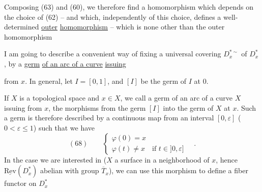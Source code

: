 Composing (63) and (60), we therefore find a homomorphism
which depends on the choice of (62) -- and which, independently of this choice, defines a well-determined \uline{outer} \uline{homomorphism} -- which is none other than the outer homomorphism

I am going to describe a convenient way of fixing a universal covering $D_x^{*\sim}$ of $D_x^*$, by a \uline{germ} \uline{of an arc of a curve}  \uline{issuing}

from $x$. In general, let $I=[0,1]$, and $[I]$ be the  germ of $I$ at $0$.  


If $X$ is a topological space and $x\in X$, we call a germ of an arc of a curve  $X$ issuing from $x$, the morphisms
from the germ $[I]$ into the  germ  of $X$ at $x$. Such a germ is therefore described by a continuous map from an interval $[0,\varepsilon]$ ($0<\varepsilon\leq1$)
such that we have
\[
(68)\qquad\left\{\begin{array}{l}
\varphi(0)=x\\
\varphi(t)\neq x\quad\text{if }t\in]0,\varepsilon]
\end{array}\right.\quad.
\]
In the case we are interested in ($X$ a surface in a neighborhood of $x$, hence $\underline{\mathrm{Rev}}(D_x^*)$   abelian with group $\overline T_x$), we can use this morphism to define a fiber functor on $D_x^*$

